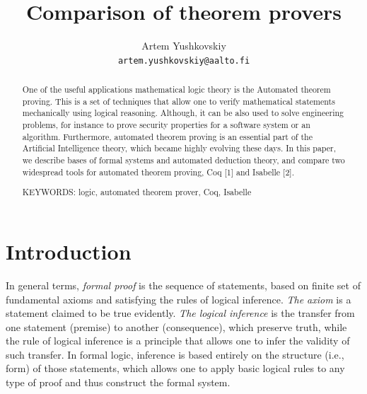 \documentclass[article]{aaltoseries}
\begin{document}
 

\title{Comparison of theorem provers}

\author{Artem Yushkovskiy
\\\textnormal{\texttt{artem.yushkovskiy@aalto.fi}}}


\maketitle


\begin{abstract}
One of the useful applications mathematical logic theory is the Automated theorem proving. This is a set of techniques that allow one to verify mathematical statements mechanically using logical reasoning. Although, it can be also used to solve engineering problems, for instance to prove security properties for a software system or an algorithm. Furthermore, automated theorem proving is an essential part of the Artificial Intelligence theory, which became highly evolving these days. In this paper, we describe bases of formal systems and automated deduction theory, and compare two widespread tools for automated theorem proving, Coq [1] and Isabelle [2].

\vspace{3mm}
\noindent KEYWORDS: logic, automated theorem prover, Coq, Isabelle

\end{abstract}




\section{Introduction}

In general terms, \textit{formal proof} is the sequence of statements, based on finite set of fundamental axioms and satisfying the rules of logical inference. \textit{The axiom} is a statement claimed to be true evidently. \textit{The logical inference} is the transfer from one statement (premise) to another (consequence), which preserve truth, while the rule of logical inference is a principle that allows one to infer the validity of such transfer. In formal logic, inference is based entirely on the structure (i.e., form) of those statements, which allows one to apply basic logical rules to any type of proof and thus construct the formal system.
\end{document}
